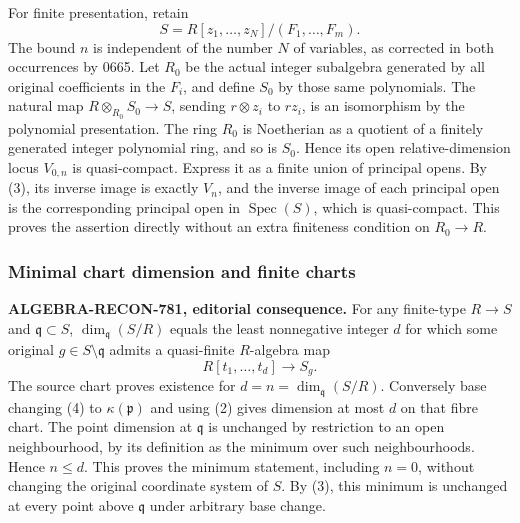For finite presentation, retain \[
 S=R[z_1,\ldots,z_N]/(F_1,\ldots,F_m).
\] The bound \(n\) is independent of the number \(N\) of variables, as corrected in both occurrences by 0665. Let \(R_0\) be the actual integer subalgebra generated by all original coefficients in the \(F_i\), and define \(S_0\) by those same polynomials. The natural map \(R\otimes_{R_0}S_0\to S\), sending \(r\otimes z_i\) to \(rz_i\), is an isomorphism by the polynomial presentation. The ring \(R_0\) is Noetherian as a quotient of a finitely generated integer polynomial ring, and so is \(S_0\). Hence its open relative-dimension locus \(V_{0,n}\) is quasi-compact. Express it as a finite union of principal opens. By (3), its inverse image is exactly \(V_n\), and the inverse image of each principal open is the corresponding principal open in \(\operatorname{Spec}(S)\), which is quasi-compact. This proves the assertion directly without an extra finiteness condition on \(R_0\to R\).

\subsubsection{Minimal chart dimension and finite charts}\label{algebra-proof-034-minimal-chart-dimension-and-finite-charts}

\textbf{ALGEBRA-\AlgebraIdentifierBreak{}RECON-\AlgebraIdentifierBreak{}781, editorial consequence.} For any finite-type \(R\to S\) and \(\mathfrak q\subset S\), \(\dim_{\mathfrak q}(S/R)\) equals the least nonnegative integer \(d\) for which some original \(g\in S\setminus\mathfrak q\) admits a quasi-finite \(R\)-algebra map \[
 R[t_1,\ldots,t_d]\longrightarrow S_g.
 \tag{4}
\] The source chart proves existence for \(d=n=\dim_{\mathfrak q}(S/R)\). Conversely base changing (4) to \(\kappa(\mathfrak p)\) and using (2) gives dimension at most \(d\) on that fibre chart. The point dimension at \(\mathfrak q\) is unchanged by restriction to an open neighbourhood, by its definition as the minimum over such neighbourhoods. Hence \(n\leq d\). This proves the minimum statement, including \(n=0\), without changing the original coordinate system of \(S\). By (3), this minimum is unchanged at every point above \(\mathfrak q\) under arbitrary base change.

